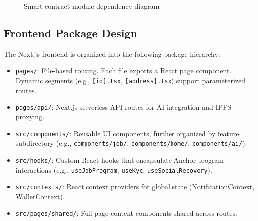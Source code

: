 \begin{figure}[H]
    \centering
    \caption{Smart contract module dependency diagram}
    \label{fig:module_map}
\end{figure}

\subsection{Frontend Package Design}
\label{subsection:4.1.3}

The Next.js frontend is organized into the following package hierarchy:

\begin{itemize}
    \item \texttt{pages/}: File-based routing. Each file exports a React page component. Dynamic segments (e.g., \texttt{[id].tsx}, \texttt{[address].tsx}) support parameterized routes.
    \item \texttt{pages/api/}: Next.js serverless API routes for AI integration and IPFS proxying.
    \item \texttt{src/components/}: Reusable UI components, further organized by feature subdirectory (e.g., \texttt{components/job/}, \texttt{components/home/}, \texttt{components/ai/}).
    \item \texttt{src/hooks/}: Custom React hooks that encapsulate Anchor program interactions (e.g., \texttt{useJobProgram}, \texttt{useKyc}, \texttt{useSocialRecovery}).
    \item \texttt{src/contexts/}: React context providers for global state (NotificationContext, WalletContext).
    \item \texttt{src/pages/shared/}: Full-page content components shared across routes.
\end{itemize}

